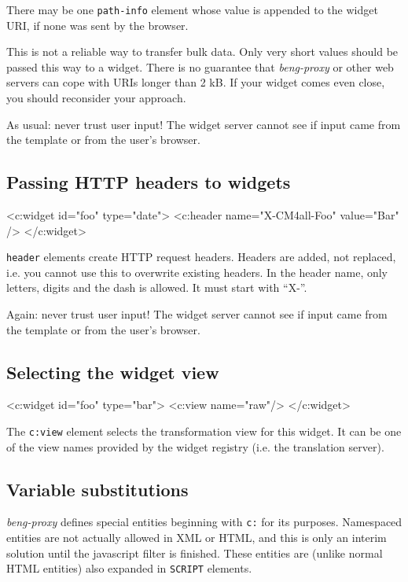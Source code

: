 \documentclass[a4paper,12pt]{article}
\begin{document}
There may be one \texttt{path-info} element whose value is appended to
the widget URI, if none was sent by the browser.

This is not a reliable way to transfer bulk data.  Only very short
values should be passed this way to a widget.  There is no guarantee
that \emph{beng-proxy} or other web servers can cope with URIs longer
than 2 kB.  If your widget comes even close, you should reconsider
your approach.

As usual: never trust user input!  The widget server cannot see if
input came from the template or from the user's browser.

\subsection{Passing HTTP headers to widgets}

\begin{verbatim*}
<c:widget id="foo" type="date">
  <c:header name="X-CM4all-Foo" value="Bar" />
</c:widget>
\end{verbatim*}

\texttt{header} elements create HTTP request headers.  Headers are
added, not replaced, i.e. you cannot use this to overwrite existing
headers.  In the header name, only letters, digits and the dash is
allowed.  It must start with ``X-''.

Again: never trust user input!  The widget server cannot see if input
came from the template or from the user's browser.

\subsection{Selecting the widget view}

\begin{verbatim*}
<c:widget id="foo" type="bar">
  <c:view name="raw"/>
</c:widget>
\end{verbatim*}

The \texttt{c:view} element selects the transformation view for this
widget.  It can be one of the view names provided by the widget
registry (i.e. the translation server).

\subsection{Variable substitutions}
\label{entities}

\emph{beng-proxy} defines special entities beginning with \texttt{c:}
for its purposes.  Namespaced entities are not actually allowed in XML
or HTML, and this is only an interim solution until the javascript
filter is finished.  These entities are (unlike normal HTML entities)
also expanded in \texttt{SCRIPT} elements.
\end{document}
